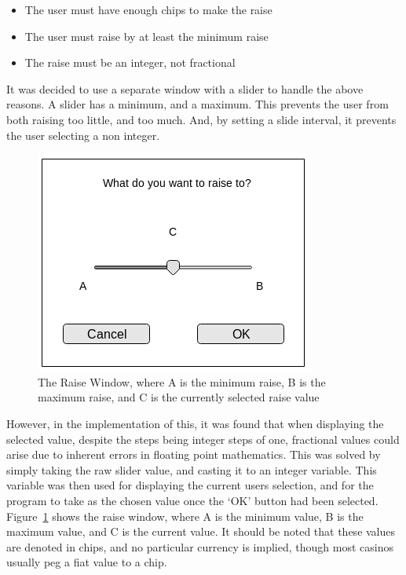 \begin{itemize}
\item The user must have enough chips to make the raise
\item The user must raise by at least the minimum raise
\item The raise must be an integer, not fractional
\end{itemize}

It was decided to use a separate window with a slider to handle the above
reasons. A slider has a minimum, and a maximum. This prevents the user from
both raising too little, and too much. And, by setting a slide interval, it
prevents the user selecting a non integer.

\begin{figure}[h]
    \centering
    \includegraphics[width=0.5\linewidth]{../images/raisewindow.png}
    \caption{The Raise Window, where A is the minimum raise, B is the maximum
             raise, and C is the currently selected raise value}%
    \label{fig:raisewindow}
\end{figure}

However, in the implementation of this, it was found that when displaying
the selected value, despite the steps being integer steps of one, 
fractional values could arise due to inherent errors in floating point 
mathematics. This was solved by simply taking the raw slider value, and 
casting it to an integer variable. This variable was then used for displaying 
the current users selection, and for the program to take as the chosen value 
once the `OK' button had been selected. Figure~\ref{fig:raisewindow} shows the 
raise window, where A is the minimum value, B is the maximum value, and C is 
the current value. It should be noted that these values are denoted in chips,
and no particular currency is implied, though most casinos usually peg a
fiat value to a chip.

